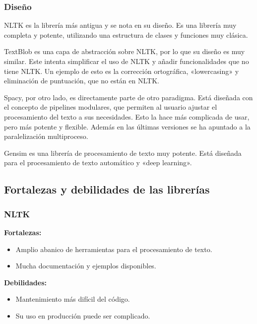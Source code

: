 \documentclass[a4paper,twocolumn]{article}
\begin{document}
    \subsubsection{Diseño}\label{subsubsec:diseno}
    NLTK es la librería más antigua y se nota en su diseño.
    Es una librería muy completa y potente, utilizando una estructura de clases y funciones muy clásica.

    TextBlob es una capa de abstracción sobre NLTK, por lo que su diseño es muy similar.
    Este intenta simplificar el uso de NLTK y añadir funcionalidades que no tiene NLTK\@.
    Un ejemplo de esto es la corrección ortográfica, «lowercasing» y eliminación de puntuación, que no están en NLTK\@.

    Spacy, por otro lado, es directamente parte de otro paradigma.
    Está diseñada con el concepto de pipelines modulares, que permiten al usuario ajustar el procesamiento del texto a sus necesidades.
    Esto la hace más complicada de usar, pero más potente y flexible.
    Además en las últimas versiones se ha apuntado a la paralelización multiproceso.

    Gensim es una librería de procesamiento de texto muy potente.
    Está diseñada para el procesamiento de texto automático y «deep learning».

    \subsection{Fortalezas y debilidades de las librerías}\label{subsec:fortalezas-y-debilidades-de-las-librerias}

    \subsubsection{NLTK}\label{subsubsec:nltk}

    \textbf{Fortalezas:}
    \begin{itemize}
        \item Amplio abanico de herramientas para el procesamiento de texto.
        \item Mucha documentación y ejemplos disponibles.
    \end{itemize}

    \textbf{Debilidades:}
    \begin{itemize}
        \item Mantenimiento más difícil del código.
        \item Su uso en producción puede ser complicado.
    \end{itemize}
\end{document}
